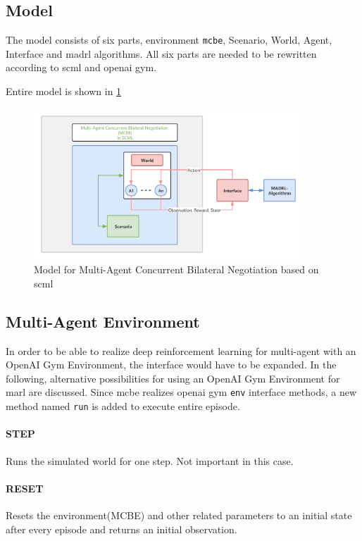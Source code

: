 \subsection{Model}
The model consists of six parts, environment \texttt{\gls{mcbe}}, Scenario, World, Agent, Interface and \gls{madrl} algorithms.
All six parts are needed to be rewritten according to \gls{scml} and \gls{openai gym}. 

Entire model is shown in \ref{fig:environment-multi-agent}
\begin{figure}[htbp]
\centering
\includegraphics[width=0.9\textwidth]{./images/MCBE.png}
\caption{Model for Multi-Agent Concurrent Bilateral Negotiation based on \gls{scml}}
\label{fig:environment-multi-agent}
\end{figure}

\subsection{Multi-Agent Environment} \label{multi-agent-env}
In order to be able to realize deep reinforcement learning for multi-agent with an OpenAI Gym Environment, the interface would have to be expanded. In the following, alternative possibilities for using an OpenAI Gym Environment for \gls{marl} are discussed. 
Since \gls{mcbe} realizes \gls{openai gym} \texttt{env} interface methods, a new method named \texttt{run} is added to execute entire episode.

\paragraph{STEP} Runs the simulated world for one step. Not important in this case. 
\paragraph{RESET} Resets the environment(MCBE) and other related parameters to an initial state after every episode and returns an initial observation.
